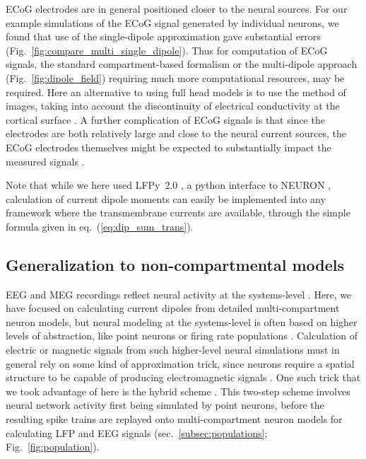 \documentclass[preprint,10pt,authoryear]{elsarticle}
\newcommand{\newtxt}[1]{{\color{Red}#1}}
\begin{document}
ECoG electrodes are in general positioned closer to the neural sources. For our example simulations of the ECoG signal generated by individual neurons, we found that use of the single-dipole approximation gave substantial errors (Fig.~\ref{fig:compare_multi_single_dipole}). Thus for computation of ECoG signals, the standard compartment-based formalism or the multi-dipole approach 
(Fig.~\ref{fig:dipole_field}) requiring much more computational resources, may be required. 
Here an alternative to using full head models is to use the method of images, taking into account the discontinuity of electrical conductivity at the cortical surface \citep{Pettersen2006, HAGEN2018}.
\newtxt{A further complication of ECoG signals is that since the electrodes are both relatively large and close to the neural current sources, the ECoG electrodes themselves might be expected to substantially impact the measured signals \citep{Ness2015, Rogers2020, Vermaas2020}.}

Note that while we here used LFPy~2.0 \citep{HAGEN2018, HAGEN2019}, a python interface to NEURON \citep{CARNEVALE2006}, calculation of current dipole moments can easily be implemented into any framework where the transmembrane currents are available, through the simple formula given in eq.~(\ref{eq:dip_sum_trans}).

\subsection{Generalization to non-compartmental models}
EEG and MEG recordings reflect neural activity at the systems-level \citep{Pesaran2018, EINEVOLL2019}. Here, we have focused on calculating current dipoles from detailed multi-compartment neuron models, but neural modeling at the systems-level is often based on higher levels of abstraction, like point neurons \citep{NEST} or firing rate populations \citep{TVB}.
Calculation of electric or magnetic signals from such higher-level neural simulations must in general rely on some kind of 
approximation trick, since neurons require a spatial structure to be capable of producing electromagnetic signals \citep{EINEVOLL2013REVIEW}.
One such trick that we took advantage of here is the hybrid scheme \citep{HAGEN2016}. This two-step scheme involves neural network activity first being simulated by point neurons, before the resulting spike trains are replayed onto multi-compartment neuron models for calculating LFP and EEG signals (sec.~\ref{subsec:populations}; Fig.~\ref{fig:population}). 
\end{document}
